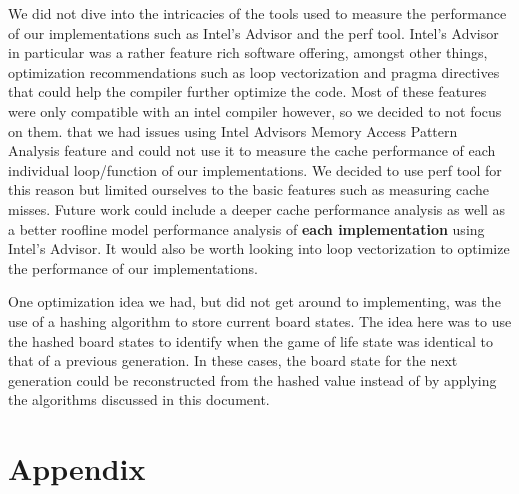 \documentclass[a4paper,english,12pt,twoside=false]{scrartcl} %
\begin{document}
We did not dive into the intricacies of the tools used to measure the performance of our implementations such as
Intel's Advisor and the perf tool. Intel's Advisor in particular was a rather feature rich software offering, amongst other things,
optimization recommendations such as loop vectorization and pragma directives that could help the compiler further
optimize the code. Most of these features were only compatible with an intel compiler however, so we decided to not focus on them.
that we had issues using Intel Advisors Memory Access Pattern Analysis feature and could not use it
to measure the cache performance of each individual loop/function of our implementations. We decided to use perf tool for this reason
but limited ourselves to the basic features such as measuring cache misses. Future work could include a deeper cache performance analysis
as well as a better roofline model performance analysis of \textbf{each implementation} using Intel's Advisor. It would also be worth looking
into loop vectorization to optimize the performance of our implementations. \breakln

One optimization idea we had, but did not get around to implementing, was the use of a hashing algorithm to store current board states.
The idea here was to use the hashed board states to identify when the game of life state was identical to that of a previous generation.
In these cases, the board state for the next generation could be reconstructed from the hashed value instead of by applying the algorithms discussed
in this document.


\section{Appendix}
\begin{center}
    \label{lst:opencl-kernel-source}
    
\end{center}
\end{document}
